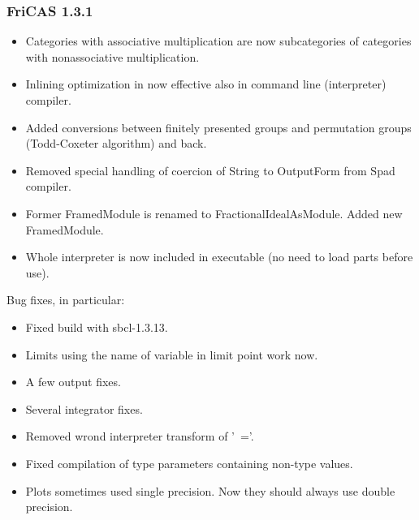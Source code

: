 \subsubsection{FriCAS 1.3.1}
\begin{itemize}

\item Categories with associative multiplication are now subcategories
      of categories with nonassociative multiplication.

\item Inlining optimization in now effective also in command line
      (interpreter) compiler.

\item Added conversions between finitely presented groups
      and permutation groups (Todd-Coxeter algorithm) and
      back.

\item Removed special handling of coercion of String to OutputForm
      from Spad compiler.

\item Former FramedModule is renamed to FractionalIdealAsModule.
      Added new FramedModule.

\item Whole interpreter is now included in executable (no need
      to load parts before use).

\end{itemize}

Bug fixes, in particular:

\begin{itemize}

\item Fixed build with sbcl-1.3.13.

\item Limits using the name of variable in limit point work
      now.

\item A few output fixes.

\item Several integrator fixes.

\item Removed wrond interpreter transform of '~='.

\item Fixed compilation of type parameters containing non-type values.

\item Plots sometimes used single precision.  Now they should
      always use double precision.

\end{itemize}
